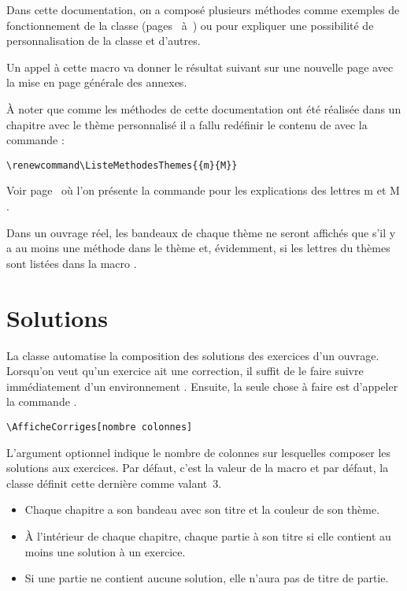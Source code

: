 \documentclass[nocrop]{sesamanuel}
\begin{document}
Dans cette documentation, on a composé plusieurs méthodes comme exemples de fonctionnement de la classe (pages~\pageref{exemple-methode-debut}
à~\pageref{exemple-methode-fin}) ou pour expliquer une possibilité de personnalisation de la classe et d'autres. 

Un appel à cette macro va donner le
résultat suivant sur une nouvelle page avec la mise en page générale des annexes.
\begingroup
\def\clearpage{\par\hrulefill\par\vspace{2cm}}
\def\pagestyle#1{}
\def\thispagestyle#1{}
\renewcommand\ListeMethodesThemes{{m}{M}}
\AfficheListeMethodes
\par\hrulefill
\endgroup



À noter que comme les méthodes de cette documentation ont été réalisée
dans un chapitre avec le thème personnalisé  il a fallu
redéfinir le contenu de  avec la commande :
\begin{verbatim}
\renewcommand\ListeMethodesThemes{{m}{M}}
\end{verbatim}
Voir page~\pageref{newthema} où l'on présente la commande 
pour les explications des lettres \og m \fg{} et \og M \fg{}.

Dans un ouvrage réel, les bandeaux de chaque thème ne seront affichés
que s'il y a au moins une méthode dans le thème et, évidemment, si les
lettres du thèmes sont listées dans la macro
.

\section{Solutions}
\label{sec-solutions}
La classe automatise la composition des solutions des exercices d'un
ouvrage. Lorsqu'on veut qu'un exercice ait une correction, il suffit
de le faire suivre immédiatement d'un environnement
. Ensuite, la seule chose à faire est d'appeler la
commande .
\begin{syntaxe}
\begin{verbatim}
\AfficheCorriges[nombre colonnes]
\end{verbatim}
L'argument optionnel indique le nombre de colonnes sur lesquelles
composer les solutions aux exercices. Par défaut, c'est la valeur de
la macro  et par défaut, la classe définit
cette dernière comme valant~3.
\end{syntaxe}
\renewcommand{\StringDOCUMENTATION}{Tout se fait automatiquement:}
\begin{documentation}
\begin{itemize}
 \item Chaque chapitre a son bandeau avec son titre et la couleur de son
thème.
\item \`A l'intérieur de chaque chapitre, chaque partie à son titre
si elle contient au moins une solution à un exercice. 
\item Si une partie ne
contient aucune solution, elle n'aura pas de titre de partie.
\end{itemize}
\end{documentation}
\end{document}
